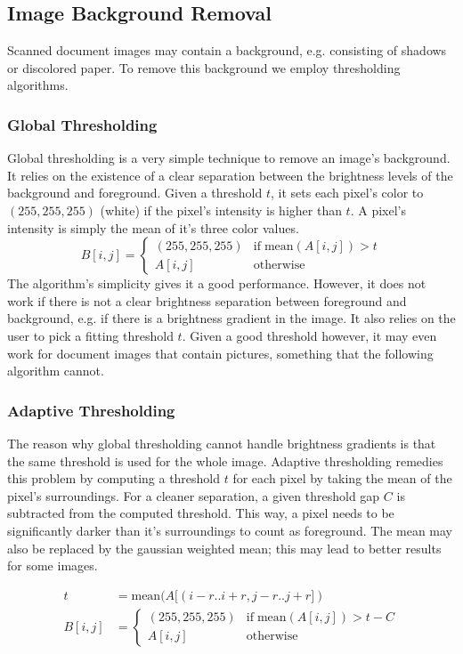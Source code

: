 \documentclass[sigconf]{acmart}
\begin{document}
\subsection{Image Background Removal}
Scanned document images may contain a background, e.g. consisting of shadows or discolored paper. To remove this background we employ thresholding algorithms.

\subsubsection{Global Thresholding}
Global thresholding is a very simple technique to remove an image's background. It relies on the existence of a clear separation between the brightness levels of the background and foreground. Given a threshold $t$, it sets each pixel's color to $(255,255,255)$ (white) if the pixel's intensity is higher than $t$. A pixel's intensity is simply the mean of it's three color values.
$$
B[i,j] = 
\begin{cases} 
    (255,255,255) & \text{if} \; \text{mean}(A[i,j]) > t \\
    A[i,j] &\text{otherwise}
\end{cases}
$$
The algorithm's simplicity gives it a good performance. However, it does not work if there is not a clear brightness separation between foreground and background, e.g. if there is a brightness gradient in the image. It also relies on the user to pick a fitting threshold $t$. Given a good threshold however, it may even work for document images that contain pictures, something that the following algorithm cannot.

\subsubsection{Adaptive Thresholding}
The reason why global thresholding cannot handle brightness gradients is that the same threshold is used for the whole image. Adaptive thresholding remedies this problem by computing a threshold $t$ for each pixel by taking the mean of the pixel's surroundings. For a cleaner separation, a given threshold gap $C$ is subtracted from the computed threshold. This way, a pixel needs to be significantly darker than it's surroundings to count as foreground. The mean may also be replaced by the gaussian weighted mean; this may lead to better results for some images.

\begin{align*}
    t &= \text{mean}(A[(i-r..i+r, j-r..j+r]) \\
    B[i,j] &= 
    \begin{cases} 
        (255,255,255) & \text{if} \; \text{mean}(A[i,j]) > t-C \\
        A[i,j] &\text{otherwise}
    \end{cases}
\end{align*}
\end{document}
